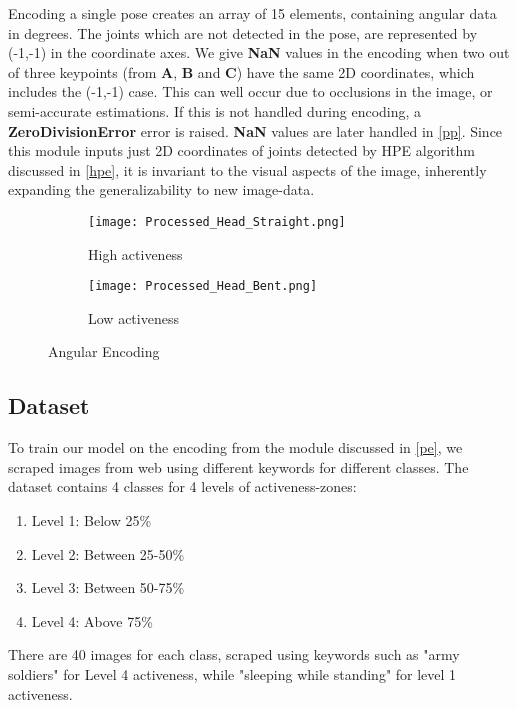 \documentclass[sigconf]{acmart}
\begin{document}
Encoding a single pose creates an array of 15 elements, containing angular data in degrees. The joints which are not detected in the pose, are represented by (-1,-1) in the coordinate axes. We give \textbf{NaN} values in the encoding when two out of three keypoints (from \textbf{A}, \textbf{B} and \textbf{C}) have the same 2D coordinates, which includes the (-1,-1) case. This can well occur due to occlusions in the image, or semi-accurate estimations. If this is not handled during encoding, a \textbf{ZeroDivisionError} error is raised. \textbf{NaN} values are later handled in \autoref{pp}.
Since this module inputs just 2D coordinates of joints detected by HPE algorithm discussed in \autoref{hpe}, it is invariant to the visual aspects of the image, inherently expanding the generalizability to new image-data.
\begin{figure}[ht]
 \begin{subfigure}{.2\textwidth}
  \texttt{[image: Processed\_Head\_Straight.png]}
  \caption{High activeness}
  \label{straight}
 \end{subfigure}
 \begin{subfigure}{.2\textwidth}
  \texttt{[image: Processed\_Head\_Bent.png]}
  \caption{Low activeness}
  \label{bent}
 \end{subfigure}
\vspace{-0.25cm}
\caption{Angular Encoding}
\label{encoding}
\end{figure}
\vspace{-0.45cm}

\subsection{Dataset}\label{data}
To train our model on the encoding from the module discussed in \autoref{pe}, we scraped images from web using different keywords for different classes. The dataset contains 4 classes for 4 levels of activeness-zones:
\begin{enumerate}
    \item Level 1: Below 25\%
    \item Level 2: Between 25-50\%
    \item Level 3: Between 50-75\%
    \item Level 4: Above 75\%
\end{enumerate}
There are 40 images for each class, scraped using keywords such as "army soldiers" for Level 4 activeness, while "sleeping while standing" for level 1 activeness.
\end{document}
